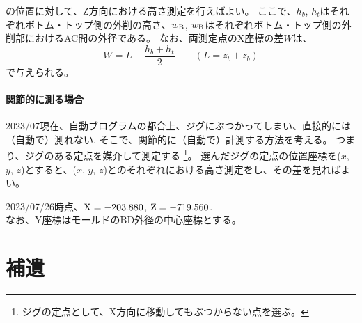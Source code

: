 の位置に対して、Z方向における高さ測定を行えばよい。
ここで、$h_b$, $h_t$はそれぞれボトム・トップ側の外削の高さ、$w_\text B$, $w_\text B$はそれぞれボトム・トップ側の外削部におけるAC間の外径である。
なお、両測定点のX座標の差$W$は、
\begin{equation}
  W = L-\frac{h_b+h_t}2 \qquad \left(L = z_t + z_b\right)
\end{equation}
で与えられる。



\subsection{関節的に測る場合}
2023/07現在、自動ブログラムの都合上、ジグにぶつかってしまい、直接的には（自動で）測れない.
そこで、関節的に（自動で）計測する方法を考える。
つまり、ジグのある定点を媒介して測定する
\footnote{ジグの定点として、X方向に移動してもぶつからない点を選ぶ。}。
選んだジグの定点の位置座標を($x$, $y$, $z$)とすると、($x$, $y$, $z$)とのそれぞれにおける高さ測定をし、その差を見ればよい。
\begin{tcolorbox}[fonttitle=\gtfamily\bfseries]
2023/07/26時点、$\text X = -203.880$, $\text Z = -719.560$.\\
なお、Y座標はモールドのBD外径の中心座標とする。
\end{tcolorbox}




\appendix
\makeatletter\@appendixtrue\makeatother
\part{補遺}




